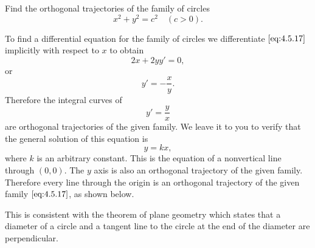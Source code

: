 \documentclass{ximera}
\begin{document}
\begin{example}\label{example:4.5.9}
Find the orthogonal trajectories of the family of circles
\begin{equation} \label{eq:4.5.17}
x^2+y^2=c^2 \quad (c>0).
\end{equation}
 
\begin{explanation}
To find a differential equation for the family of circles we
differentiate $\eqref{eq:4.5.17}$ implicitly with respect to $x$ to obtain
$$
2x+2yy'=0,
$$
or
$$
y'=-\frac{x}{y}.
$$
Therefore the integral curves  of
$$
y'=\frac{y}{x}
$$
are orthogonal trajectories of the given family. We leave it to you to
verify that the general solution of this equation is
$$
y=kx,
$$
where $k$ is an arbitrary constant. This is the equation of a
nonvertical line through $(0,0)$. The $y$ axis is also an orthogonal
trajectory of the given family. Therefore every line through the
origin is an orthogonal trajectory of the given family $\eqref{eq:4.5.17}$, as shown below.
 
\begin{center}
\end{center}
 
 
This is consistent with the theorem of plane
geometry which states that a diameter of a circle and a tangent line
to the circle at the end of the diameter are perpendicular.
\end{explanation}
\end{example}
 
\end{document}
